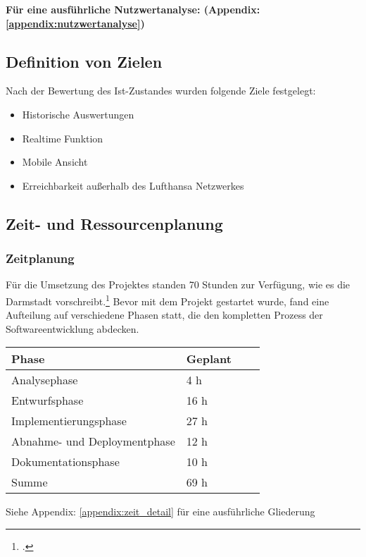 		\textbf{Für eine ausführliche Nutzwertanalyse: (Appendix: \ref{appendix:nutzwertanalyse})}

	\subsection{Definition von Zielen}
	Nach der Bewertung des Ist-Zustandes wurden folgende Ziele festgelegt:
	\begin{itemize}
		\item Historische Auswertungen
		\item Realtime Funktion
		\item Mobile Ansicht
		\item Erreichbarkeit außerhalb des Lufthansa Netzwerkes
	\end{itemize}


	\subsection{Zeit- und Ressourcenplanung}

	\subsubsection{Zeitplanung}
	Für die Umsetzung des Projektes standen 70 Stunden zur Verfügung, wie es die  Darmstadt vorschreibt.\footcite{2} Bevor mit dem Projekt gestartet wurde, fand eine Aufteilung auf verschiedene Phasen statt,
	die den kompletten Prozess der Softwareentwicklung abdecken.\\

	\begin{table}[htp]

		\begin{center}
			\begin{tabular}{llll} \toprule
				Phase & Geplant\\ \bottomrule
				Analysephase & 4 h \\
				Entwurfsphase & 16 h \\
				Implementierungsphase & 27 h \\
				Abnahme- und Deploymentphase & 12 h \\
				Dokumentationsphase & 10 h \\ \bottomrule
				Summe & 69 h \\
			\end{tabular}
		\end{center}
	Siehe Appendix: \ref{appendix:zeit_detail} für eine ausführliche Gliederung
	\end{table}


